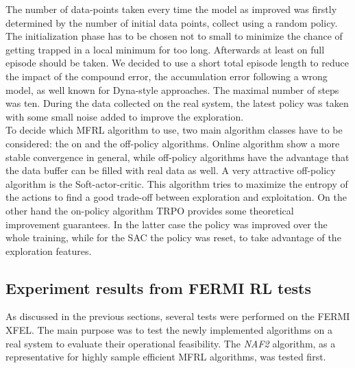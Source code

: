 \documentclass[
 reprint,
 amsmath,amssymb,amsfonts,clevref,
 aps,
prstab,
]{revtex4-2}
\begin{document}
The number of data-points taken every time the model as improved was firstly determined by the number of initial data points, collect using a random policy. The initialization phase has to be chosen not to small to minimize the chance of getting trapped in a local minimum for too long. Afterwards at least on full episode should be taken. We decided to use a short total episode length to reduce the impact of the compound error, the accumulation error following a wrong model, as well known for Dyna-style approaches. The maximal number of steps was ten. During the data collected on the real system, the latest policy was taken with some small noise added to improve the exploration.\\
To decide which MFRL algorithm to use, two main algorithm classes have to be considered: the on and the off-policy algorithms. Online algorithm show a more stable convergence in general, while off-policy algorithms have the advantage that the data buffer can be filled with real data as well. A very attractive off-policy algorithm is the Soft-actor-critic. This algorithm tries to maximize the entropy of the actions to find a good trade-off between exploration and exploitation. On the other hand the on-policy algorithm TRPO provides some theoretical improvement guarantees. In the latter case the policy was improved over the whole training, while for the SAC the policy was reset, to take advantage of the exploration features.


\subsection{Experiment results from FERMI RL tests}
As discussed in the previous sections, several tests were performed on the FERMI XFEL.
The main purpose was to test the newly implemented algorithms on a real system to evaluate their operational feasibility. The \emph{NAF2} algorithm, as a representative for highly sample efficient MFRL algorithms, was tested first.
\end{document}
